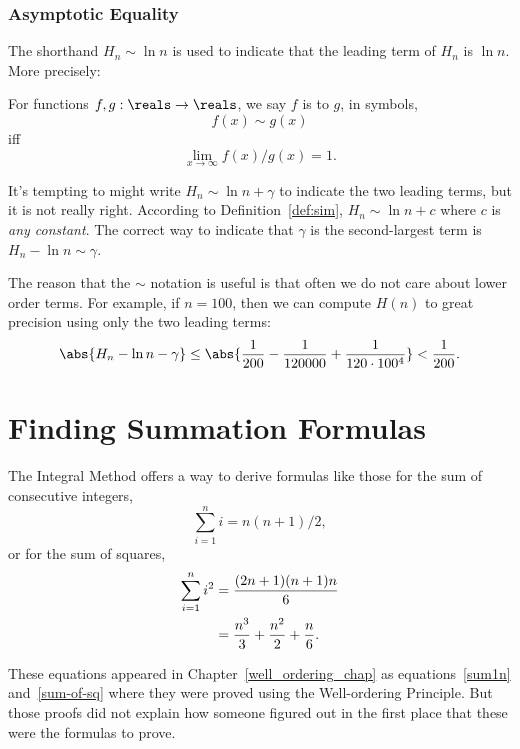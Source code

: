 \subsubsection{Asymptotic Equality}
The shorthand $H_n \sim \ln n$ is used to indicate that the leading
term of $H_n$ is $\ln n$.  More precisely:
\begin{definition}\label{def:sim}
  For functions $f,g: \reals \to \reals$, we say $f$ is  to $g$, in symbols,
\[
f(x) \sim g(x)
\]
iff
\[
\lim_{x \rightarrow \infty} f(x)/g(x) = 1.
\]
\end{definition}

It's tempting to might write $H_n \sim \ln n + \gamma$ to indicate the two
leading terms, but it is not really right.  According to
Definition~\ref{def:sim}, $H_n \sim \ln n + c$ where $c$ is \emph{any
  constant}.  The correct way to indicate that $\gamma$ is the
second-largest term is $H_n - \ln n \sim \gamma$.

The reason that the $\sim$ notation is useful is that often we do not care
about lower order terms.  For example, if $n = 100$, then we can compute
$H(n)$ to great precision using only the two leading terms:
\[
\abs{H_n - \ln n - \gamma} \leq \abs{\frac{1}{200} - \frac{1}{120000} +
\frac{1}{120 \cdot 100^4}} < \frac{1}{200}.
\]
\begin{problems}
\classproblems
{}

\homeworkproblems
{}

\end{problems}
\section{Finding Summation Formulas}\label{findsum_sec}

The Integral Method offers a way to derive formulas like those
for the sum of consecutive integers,
\[
\sum_{i=1}^n i = n(n+1)/2,
\]
or for the sum of squares,
\begin{align}
\sum_{i=1}^n i^2 & =  \frac{(2n+1)(n+1)n}{6}\notag \\
                & =  \frac{n^3}{3} + \frac{n^2}{2} + \frac{n}{6}.\label{sumsqcubic}
\end{align}

These equations appeared in Chapter~\ref{well_ordering_chap} as
equations~\eqref{sum1n} and~\eqref{sum-of-sq} where they were proved using
the Well-ordering Principle.  But those proofs did not explain how someone
figured out in the first place that these were the formulas to prove.

